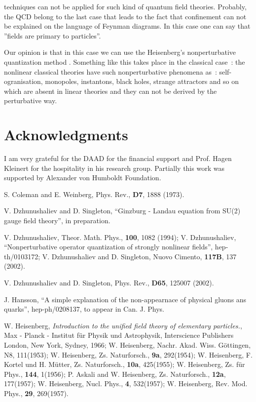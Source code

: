 \documentclass[a4paper,a4paper]{article}
\begin{document}
techniques can not be applied for such kind of quantum field theories. 
Probably, the QCD belong to the last case that leads to the fact that 
confinement can not be explained on the language of Feynman diagrams. 
In this case one can say \cite{hansson} that ''fields are primary 
to particles''. 
\par 
Our opinion is that in this case we can use the Heisenberg's 
nonperturbative quantization method \cite{heis}. 
Something like this takes place in the classical case~: 
the nonlinear classical theories have such nonperturbative phenomena 
as~: self-ogranisation, monopoles, instantons, black holes, strange attractors 
and so on which are absent in linear theories and they can not be 
derived by the perturbative way. 

\section{Acknowledgments}
I am very grateful for the DAAD for the financial support and 
Prof. Hagen Kleinert for the hospitality in his research group. 
Partially this work was supported by Alexander von 
Humboldt Foundation. 

\begin{thebibliography}{99}


S. Coleman and E. Weinberg, Phys. Rev., \textbf{D7}, 1888 (1973).

V. Dzhunushaliev and D. Singleton, ``Ginzburg - Landau equation 
from SU(2) gauge field theory'', in preparation. 

V. Dzhunushaliev, Theor. Math. Phys., \textbf{100}, 1082 (1994); 
V. Dzhunushaliev, ``Nonperturbative operator 
quantization of strongly nonlinear fields'', hep-th/0103172; 
V. Dzhunushaliev and D. Singleton, Nuovo Cimento, \textbf{117B}, 
137 (2002). 

V. Dzhunushaliev and D. Singleton, Phys. Rev., \textbf{D65}, 
125007 (2002).

J. Hansson, ``A simple explanation of the non-appearnace of physical 
gluons ans quarks'', hep-ph/0208137, to appear in Can. J. Phys. 

W. Heisenberg, \textit{Introduction to the unified field theory of
elementary particles.}, Max - Planck - Institut f\"ur Physik und
Astrophysik, Interscience Publishers London, New York, Sydney,
1966; W. Heisenberg, Nachr. Akad. Wiss. G\"ottingen, N8,
111(1953); W. Heisenberg, Zs. Naturforsch., \textbf{9a},
292(1954); W. Heisenberg, F. Kortel und H. M\"utter, Zs.
Naturforsch., \textbf{10a}, 425(1955); W. Heisenberg, Zs. f\"ur
Phys., \textbf{144}, 1(1956); P. Askali and W. Heisenberg, Zs.
Naturforsch., \textbf{12a}, 177(1957); W. Heisenberg, Nucl. Phys.,
\textbf{4}, 532(1957); W. Heisenberg, Rev. Mod. Phys., \textbf{29},
269(1957).

\end{thebibliography}
\end{document}
